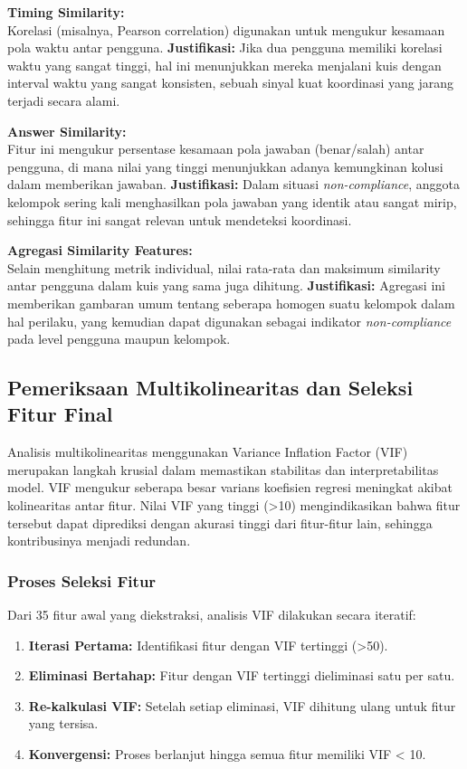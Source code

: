 \textbf{Timing Similarity:} \\
Korelasi (misalnya, Pearson correlation) digunakan untuk mengukur kesamaan pola waktu antar pengguna.
\textbf{Justifikasi:} Jika dua pengguna memiliki korelasi waktu yang sangat tinggi, hal ini menunjukkan mereka menjalani kuis dengan interval waktu yang sangat konsisten, sebuah sinyal kuat koordinasi yang jarang terjadi secara alami.

\textbf{Answer Similarity:} \\
Fitur ini mengukur persentase kesamaan pola jawaban (benar/salah) antar pengguna, di mana nilai yang tinggi menunjukkan adanya kemungkinan kolusi dalam memberikan jawaban.
\textbf{Justifikasi:} Dalam situasi \textit{non-compliance}, anggota kelompok sering kali menghasilkan pola jawaban yang identik atau sangat mirip, sehingga fitur ini sangat relevan untuk mendeteksi koordinasi.

\textbf{Agregasi Similarity Features:} \\
Selain menghitung metrik individual, nilai rata-rata dan maksimum similarity antar pengguna dalam kuis yang sama juga dihitung.
\textbf{Justifikasi:} Agregasi ini memberikan gambaran umum tentang seberapa homogen suatu kelompok dalam hal perilaku, yang kemudian dapat digunakan sebagai indikator \textit{non-compliance} pada level pengguna maupun kelompok.

\subsection{Pemeriksaan Multikolinearitas dan Seleksi Fitur Final}
\label{sec:pemeriksaanMultikolinearitas}

Analisis multikolinearitas menggunakan Variance Inflation Factor (VIF) merupakan langkah krusial dalam memastikan stabilitas dan interpretabilitas model. VIF mengukur seberapa besar varians koefisien regresi meningkat akibat kolinearitas antar fitur. Nilai VIF yang tinggi (>10) mengindikasikan bahwa fitur tersebut dapat diprediksi dengan akurasi tinggi dari fitur-fitur lain, sehingga kontribusinya menjadi redundan.

\subsubsection{Proses Seleksi Fitur}
Dari 35 fitur awal yang diekstraksi, analisis VIF dilakukan secara iteratif:
\begin{enumerate}
    \item \textbf{Iterasi Pertama:} Identifikasi fitur dengan VIF tertinggi (>50).
    \item \textbf{Eliminasi Bertahap:} Fitur dengan VIF tertinggi dieliminasi satu per satu.
    \item \textbf{Re-kalkulasi VIF:} Setelah setiap eliminasi, VIF dihitung ulang untuk fitur yang tersisa.
    \item \textbf{Konvergensi:} Proses berlanjut hingga semua fitur memiliki VIF < 10.
\end{enumerate}


